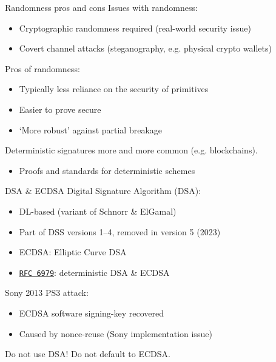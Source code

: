 \begin{frame}{Randomness pros and cons}
  \pause
  Issues with randomness:
  \begin{itemize}[<+(1)->]
    \item Cryptographic randomness required (real-world security issue)
    \item Covert channel attacks (steganography, e.g. physical crypto wallets)
  \end{itemize}

  \pause
  Pros of randomness:
  \begin{itemize}[<+(1)->]
    \item Typically less reliance on the security of primitives
    \item Easier to prove secure
    \item `More robust' against partial breakage
  \end{itemize}

  \pause
  Deterministic signatures more and more common (e.g. blockchains).
  \begin{itemize}[<+(1)->]
    \item Proofs and standards for deterministic schemes
  \end{itemize}
\end{frame}

\begin{frame}{DSA \& ECDSA}
  \pause
  Digital Signature Algorithm (DSA):
  \begin{itemize}[<+(1)->]
    \item DL-based (variant of Schnorr \& ElGamal)
    \item Part of DSS versions 1--4, removed in version 5 (2023)
    \item ECDSA: Elliptic Curve DSA
    \item \href{https://datatracker.ietf.org/doc/html/rfc6979}{\texttt{RFC 6979}}: deterministic DSA \& ECDSA
  \end{itemize}

  \pause
  Sony 2013 PS3 attack:
  \begin{itemize}
    \item ECDSA software signing-key recovered
    \item Caused by nonce-reuse (Sony implementation issue)
  \end{itemize}

  \pause
  Do not use DSA! Do not default to ECDSA.
\end{frame}

